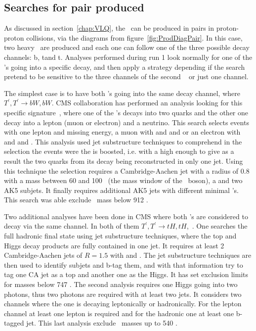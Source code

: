 \subsection{Searches for pair produced \Tp}
\label{sec:pairanal}

As discussed in section~\ref{chap:VLQ}, the \Tp~can be produced in pairs in proton-proton collisions, via the diagrams from figure~\ref{fig:ProdDiagPair}. In this case, two heavy \Tp~are produced and each one can follow one of the three possible decay channels: b\W, t\Z and t\Hb. Analyses performed during run 1 look normally for one of the \Tp's going into a specific decay, and then apply a strategy depending if the search pretend to be sensitive to the three channels of the second \Tp~ or just one channel. 

The simplest case is to have both \Tp's going into the same decay channel, where $T^{'},T^{'}\rightarrow bW,bW$. CMS collaboration has performed an analysis looking for this specific signature~\cite{CMS-PAS-B2G-12-017}, where one of the \W's decays into two quarks and the other one decay into a lepton (muon or electron) and a neutrino. This search selects events with one lepton and missing energy, a muon with  and  and  or an electron with  and  and . This analysis used jet substructure techniques to comprehend in the selection the events were the \W is boosted, i.e. with a high \pt enough to give as a result the two quarks from its decay being reconstructed in only one jet. Using this technique the selection requires a Cambridge-Aachen jet with a radius of 0.8 with a mass between 60 and 100 \GeVcc~(the mass window of the \W~boson), a  and two AK5 subjets. It finally requires additional AK5 jets with different minimal \pt's. This search was able exclude \Tp~mass below 912 \GeVcc.

Two additional analyses have been done in CMS where both \Tp's are considered to decay via the same channel. In both of them $T^{'},T^{'}\rightarrow tH,tH$,~\cite{Khachatryan:2015axa,CMS-PAS-B2G-14-003}. One searches the full hadronic final state using jet substructure techniques, where the top and Higgs decay products are fully contained in one jet. It requires at least 2 Cambridge-Aachen jets of $R=1.5$ with  and . The jet substructure techniques are then used to identify subjets and b-tag them, and with that information try to tag one CA jet as a top and another one as the Higgs. It has set exclusion limits for masses below 747 \GeVcc. The second analysis requires one Higgs going into two photons, thus two photons are required with at least two jets. It considers two channels where the one \W is decaying leptonically or hadronically. For the lepton channel at least one lepton is required and for the hadronic one at least one b-tagged jet. This last analysis exclude \Tp~masses up to 540 \GeVcc.

